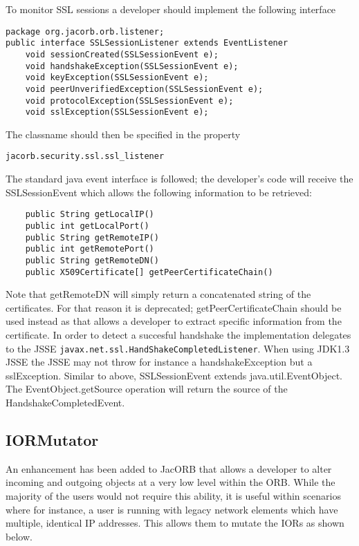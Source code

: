 To monitor SSL sessions a developer should implement the following interface
\begin{small}
\begin{verbatim}
package org.jacorb.orb.listener;
public interface SSLSessionListener extends EventListener
    void sessionCreated(SSLSessionEvent e);
    void handshakeException(SSLSessionEvent e);
    void keyException(SSLSessionEvent e);
    void peerUnverifiedException(SSLSessionEvent e);
    void protocolException(SSLSessionEvent e);
    void sslException(SSLSessionEvent e);
\end{verbatim}
\end{small}
The classname should then be specified in the property
\begin{verbatim}
jacorb.security.ssl.ssl_listener
\end{verbatim}

The standard java event interface is followed; the developer's code will receive the
SSLSessionEvent which allows the following information to be retrieved:
\begin{small}
\begin{verbatim}
    public String getLocalIP()
    public int getLocalPort()
    public String getRemoteIP()
    public int getRemotePort()
    public String getRemoteDN()
    public X509Certificate[] getPeerCertificateChain()
\end{verbatim}
\end{small}

Note that getRemoteDN will simply return a concatenated string of the
certificates. For that reason it is deprecated; getPeerCertificateChain should
be used instead as that allows a developer to extract specific information from
the certificate.  In order to detect a succesful handshake the implementation
delegates to the JSSE {\tt javax.net.ssl.HandShakeCompletedListener}. When using
JDK1.3 JSSE the JSSE may not throw for instance a handshakeException but a
sslException. Similar to above, SSLSessionEvent extends java.util.EventObject. The
EventObject.getSource operation will return the source of the HandshakeCompletedEvent.

\subsection{IORMutator}
\label{iorMutator}

An enhancement has been added to JacORB that allows a developer to alter incoming
and outgoing objects at a very low level within the ORB. While the majority of the
users would not require this ability, it is useful within scenarios where for instance,
a user is running with legacy network elements which have multiple, identical IP
addresses. This allows them to mutate the IORs as shown below.

